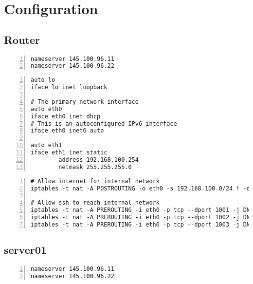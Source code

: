 \documentclass[Configuration]{subfiles}
\begin{document}
\newpage
\section{Configuration}
\label{sec:Configuration}

\subsection{Router}

\begin{lstlisting}[frame=single,caption=/etc/resolv.conf,backgroundcolor=\color{gray},breaklines=true,numbers=left,]
nameserver 145.100.96.11
nameserver 145.100.96.22
\end{lstlisting}

\begin{lstlisting}[frame=single,caption=/etc/network/interfaces,backgroundcolor=\color{gray},breaklines=true,numbers=left,]
auto lo
iface lo inet loopback

# The primary network interface
auto eth0
iface eth0 inet dhcp
# This is an autoconfigured IPv6 interface
iface eth0 inet6 auto

auto eth1
iface eth1 inet static
        address 192.168.100.254
        netmask 255.255.255.0
\end{lstlisting}

\begin{lstlisting}[frame=single,caption=/etc/network/interfaces,backgroundcolor=\color{gray},breaklines=true,numbers=left,]
# Allow internet for internal network
iptables -t nat -A POSTROUTING -o eth0 -s 192.168.100.0/24 ! -d 192.168.100.0/24 -j SNAT --to-source 145.100.104.61

# Allow ssh to reach internal network
iptables -t nat -A PREROUTING -i eth0 -p tcp --dport 1001 -j DNAT --to-destination 192.168.100.1:22
iptables -t nat -A PREROUTING -i eth0 -p tcp --dport 1002 -j DNAT --to-destination 192.168.100.2:22
iptables -t nat -A PREROUTING -i eth0 -p tcp --dport 1003 -j DNAT --to-destination 192.168.100.3:22
\end{lstlisting}

\subsection{server01}

\begin{lstlisting}[frame=single,caption=/etc/resolv.conf,backgroundcolor=\color{gray},breaklines=true,numbers=left,]
nameserver 145.100.96.11
nameserver 145.100.96.22
\end{lstlisting}
\end{document}
